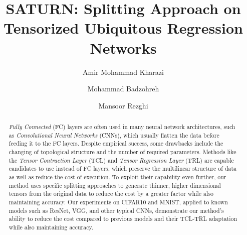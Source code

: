 \documentclass[runningheads]{llncs}
\begin{document}
\title{SATURN: Splitting Approach on Tensorized Ubiquitous Regression Networks} 


\author{
Amir Mohammad Kharazi
\and
Mohammad Badzohreh
\and
Mansoor Rezghi
}



\maketitle


\begin{abstract}
  \textit{Fully Connected} (FC) layers are often used in many neural network architectures, such as \textit{Convolutional Neural Networks} (CNNs), which usually flatten the data before feeding it to the FC layers. Despite empirical success, some drawbacks include the changing of topological structure and the number of required parameters. Methods like the \textit{Tensor Contraction Layer} (TCL) and \textit{Tensor Regression Layer} (TRL) are capable candidates to use instead of FC layers, which preserve the multilinear structure of data as well as reduce the cost of execution. To exploit their capability even further, our method uses specific splitting approaches to generate thinner, higher dimensional tensors from the original data to reduce the cost by a greater factor while also maintaining accuracy. Our experiments on CIFAR10 and MNIST, applied to known models such as ResNet, VGG, and other typical CNNs, demonstrate our method's ability to reduce the cost compared to previous models and their TCL-TRL adaptation while also maintaining accuracy.
\end{abstract}
\end{document}

